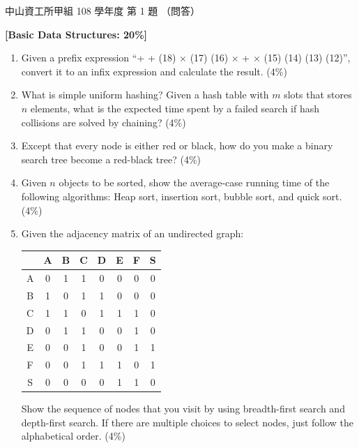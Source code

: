 \begin{pastexam}[label={px:nsysu-108-osds-01}]{中山資工所甲組 108 學年度 第 1 題}
（問答）

\textbf{[Basic Data Structures: 20\%]}
\begin{enumerate}[label=(\arabic*)]
\item Given a prefix expression ``+ + (18) $\times$ (17) (16) $\times$ + $\times$ (15) (14) (13)
(12)'', convert it to an infix expression and calculate the result. (4\%)
\item What is simple uniform hashing? Given a hash table with $m$ slots that stores $n$ elements,
what is the expected time spent by a failed search if hash collisions are solved by chaining?
(4\%)
\item Except that every node is either red or black, how do you make a binary search tree become a
red-black tree? (4\%)
\item Given $n$ objects to be sorted, show the average-case running time of the following
algorithms: Heap sort, insertion sort, bubble sort, and quick sort. (4\%)
\item Given the adjacency matrix of an undirected graph:
\begin{center}
\begin{tabular}{|c|c|c|c|c|c|c|c|}
\hline
 & A & B & C & D & E & F & S \\ \hline
A & 0 & 1 & 1 & 0 & 0 & 0 & 0 \\ \hline
B & 1 & 0 & 1 & 1 & 0 & 0 & 0 \\ \hline
C & 1 & 1 & 0 & 1 & 1 & 1 & 0 \\ \hline
D & 0 & 1 & 1 & 0 & 0 & 1 & 0 \\ \hline
E & 0 & 0 & 1 & 0 & 0 & 1 & 1 \\ \hline
F & 0 & 0 & 1 & 1 & 1 & 0 & 1 \\ \hline
S & 0 & 0 & 0 & 0 & 1 & 1 & 0 \\ \hline
\end{tabular}
\end{center}
Show the sequence of nodes that you visit by using breadth-first search and depth-first search.
If there are multiple choices to select nodes, just follow the alphabetical order. (4\%)
\end{enumerate}
\end{pastexam}

